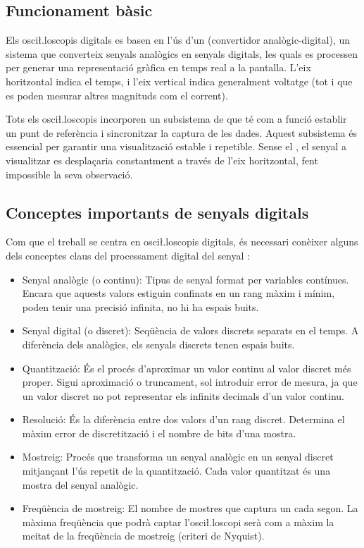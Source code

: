\documentclass{tfgitic}[2023/07/07]
\begin{document}
\subsection{Funcionament bàsic}
\label{subsec:funcionament-bàsic}

Els osci\l.loscopis digitals es basen en l'ús d'un 
(convertidor analògic-digital), un sistema que converteix senyals
analògics en senyals digitals, les quals es processen per generar una
representació gràfica en temps real a la pantalla. L'eix horitzontal
indica el temps, i l'eix vertical indica generalment voltatge (tot i
que es poden mesurar altres magnituds com el corrent).

Tots els osci\l.loscopis incorporen un subsistema de 
\cite{funcionament-trigger} que té com a funció establir un punt de
referència i sincronitzar la captura de les dades. Aquest subsistema
és essencial per garantir una visualització estable i repetible. Sense
el , el senyal a visualitzar es desplaçaria constantment
a través de l'eix horitzontal, fent impossible la seva observació.

\subsection{Conceptes importants de senyals digitals}
\label{subsec:conceptes-pds}

Com que el treball se centra en osci\l.loscopis digitals, és necessari
conèixer alguns dels conceptes claus del processament digital del
senyal \cite{llibre-pds}:

\begin{itemize}
	\item Senyal analògic (o continu): Tipus de senyal format per
          variables contínues. Encara que aquests valors estiguin
          confinats en un rang màxim i mínim, poden tenir una precisió
          infinita, no hi ha espais buits.
	\item Senyal digital (o discret): Seqüència de valors discrets
          separats en el temps. A diferència dels analògics, els
          senyals discrets tenen espais buits.
	\item Quantització: És el procés d'aproximar un valor continu
          al valor discret més proper. Sigui aproximació o truncament,
          sol introduir error de mesura, ja que un valor discret no
          pot representar els infinits decimals d'un valor continu.
	\item Resolució: És la diferència entre dos valors d'un rang
          discret. Determina el màxim error de discretització i el
          nombre de bits d'una mostra.
	\item Mostreig: Procés que transforma un senyal analògic en un
          senyal discret mitjançant l'ús repetit de la quantització.
          Cada valor quantitzat és una mostra del senyal analògic.
	\item Freqüència de mostreig: El nombre de mostres que captura
          un  cada segon. La màxima freqüència que podrà
          captar l'osci\l.loscopi serà com a màxim la meitat de la
          freqüència de mostreig (criteri de Nyquist).
\end{itemize}
\end{document}
